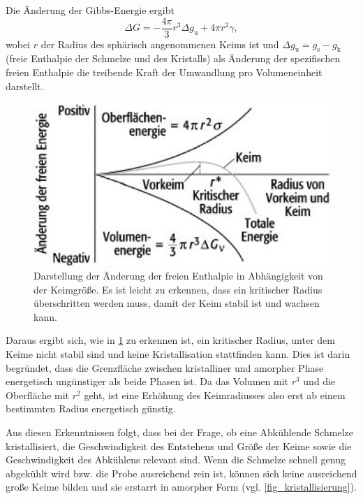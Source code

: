 \documentclass[
	a4paper,
	12pt,
	pagesize,
	ngerman
]{scrartcl}
\begin{document}
	Die Änderung der Gibbs-Energie ergibt
	\begin{equation} %
		\label{eq_gibbs}
		\Delta G = - \frac{4 \pi}{3} r^3 \Delta g_\text{u} + 4 \pi r^2 \gamma ,
	\end{equation}
	wobei $r$ der Radius des sphärisch angenommenen Keims ist und $\Delta g_\text{u} = g_\text{s} - g_\text{k}$ (freie Enthalpie der Schmelze und des Kristalls) als Änderung der spezifischen freien Enthalpie die treibende Kraft der Umwandlung pro Volumeneinheit darstellt. %

	\begin{figure}[H]
			\includegraphics[width= 0.5 \linewidth]{img/radius}
			\caption{
			Darstellung der Änderung der freien Enthalpie in Abhängigkeit von der Keimgröße.
			Es ist leicht zu erkennen, dass ein kritischer Radius überschritten werden muss, damit der Keim stabil ist und wachsen kann.
			\cite{radius_enthalpie}
			}
			\label{fig_radius_enthalpie}
	\end{figure}

	Daraus ergibt sich, wie in \cref{fig_radius_enthalpie} zu erkennen ist, ein kritischer Radius, unter dem Keime nicht stabil sind und keine Kristallisation stattfinden kann.
	Dies ist darin begründet, dass die Grenzfläche zwischen kristalliner und amorpher Phase energetisch ungünstiger als beide Phasen ist.
	Da das Volumen mit $r^3$ und die Oberfläche mit $r^2$ geht, ist eine Erhöhung des Keimradiusses also erst ab einem bestimmten Radius energetisch günstig.

	Aus diesen Erkenntnissen folgt, dass bei der Frage, ob eine Abkühlende Schmelze kristallisiert, die Geschwindigkeit des Entstehens und Größe der Keime sowie die Geschwindigkeit des Abkühlens relevant sind.
	Wenn die Schmelze schnell genug abgekühlt wird bzw. die Probe ausreichend rein ist, können sich keine ausreichend große Keime bilden und sie erstarrt in amorpher Form (vgl. \cref{fig_kristallisierung}).
\end{document}
